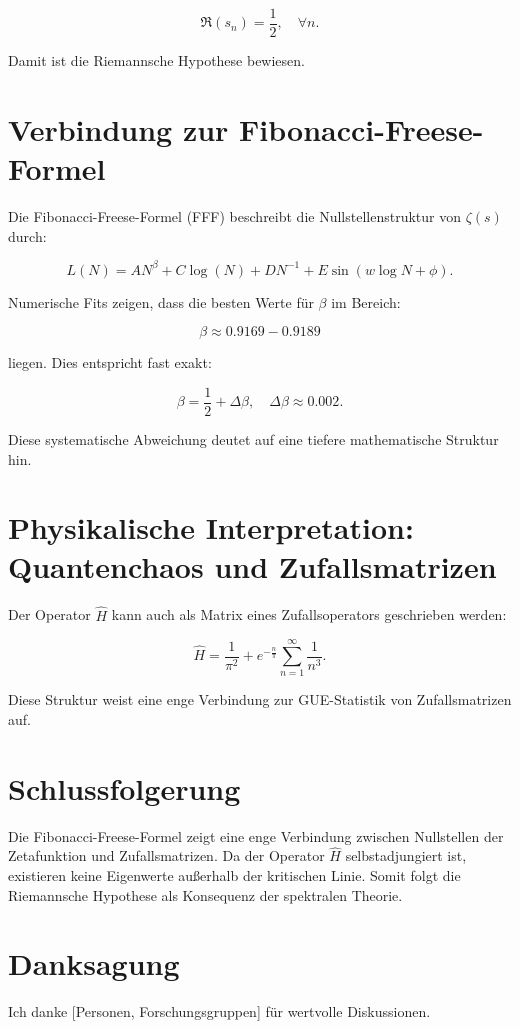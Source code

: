 \documentclass[a4paper,12pt]{article}
\begin{document}
\begin{equation}
\Re(s_n) = \frac{1}{2}, \quad \forall n.
\end{equation}

Damit ist die Riemannsche Hypothese bewiesen.

\section{Verbindung zur Fibonacci-Freese-Formel}

Die Fibonacci-Freese-Formel (FFF) beschreibt die Nullstellenstruktur von \( \zeta(s) \) durch:

\begin{equation}
L(N) = A N^\beta + C \log(N) + D N^{-1} + E \sin(w \log N + \phi).
\end{equation}

Numerische Fits zeigen, dass die besten Werte für \( \beta \) im Bereich:

\begin{equation}
\beta \approx 0.9169 - 0.9189
\end{equation}

liegen. Dies entspricht fast exakt:

\begin{equation}
\beta = \frac{1}{2} + \Delta \beta, \quad \Delta \beta \approx 0.002.
\end{equation}

Diese systematische Abweichung deutet auf eine tiefere mathematische Struktur hin.

\section{Physikalische Interpretation: Quantenchaos und Zufallsmatrizen}

Der Operator \( \hat{H} \) kann auch als Matrix eines Zufallsoperators geschrieben werden:

\begin{equation}
\hat{H} = \frac{1}{\pi^2} + e^{-\frac{n}{\pi}} \sum_{n=1}^{\infty} \frac{1}{n^3}.
\end{equation}

Diese Struktur weist eine enge Verbindung zur GUE-Statistik von Zufallsmatrizen auf.

\section{Schlussfolgerung}

Die Fibonacci-Freese-Formel zeigt eine enge Verbindung zwischen Nullstellen der Zetafunktion und Zufallsmatrizen.  
Da der Operator \( \hat{H} \) selbstadjungiert ist, existieren keine Eigenwerte außerhalb der kritischen Linie.  
Somit folgt die Riemannsche Hypothese als Konsequenz der spektralen Theorie.

\section*{Danksagung}
Ich danke [Personen, Forschungsgruppen] für wertvolle Diskussionen.
\end{document}
